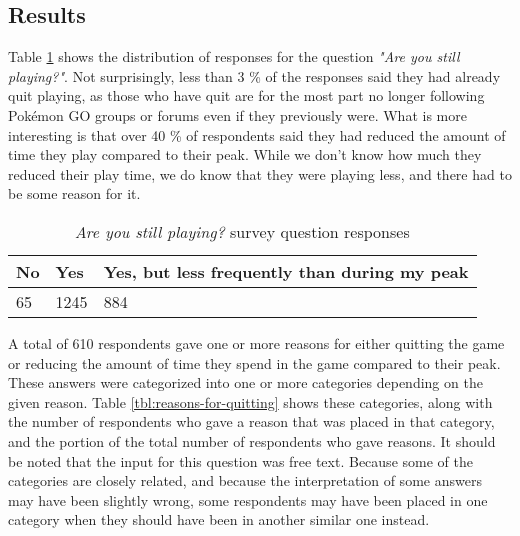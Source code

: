 

\subsection{Results}

Table \ref{tbl:still-playing} shows the distribution of responses for the question \emph{"Are you still playing?"}. Not surprisingly, less than 3 \% of the responses said they had already quit playing, as those who have quit are for the most part no longer following Pokémon GO groups or forums even if they previously were. What is more interesting is that over 40 \% of respondents said they had reduced the amount of time they play compared to their peak. While we don't know how much they reduced their play time, we do know that they were playing less, and there had to be some reason for it.

\begin{table}[h]
	\centering
	\begin{tabular}{|l|l|l|}
		\hline
		\textbf{No} & \textbf{Yes} & \textbf{Yes, but less frequently than during my peak}\\
		\hline\hline
		65 & 1245 & 884\\\hline
	\end{tabular}
	\caption{\emph{Are you still playing?} survey question responses}
	\label{tbl:still-playing}
\end{table}

A total of 610 respondents gave one or more reasons for either quitting the game or reducing the amount of time they spend in the game compared to their peak. These answers were categorized into one or more categories depending on the given reason. Table \ref{tbl:reasons-for-quitting} shows these categories, along with the number of respondents who gave a reason that was placed in that category, and the portion of the total number of respondents who gave reasons. It should be noted that the input for this question was free text. Because some of the categories are closely related, and because the interpretation of some answers may have been slightly wrong, some respondents may have been placed in one category when they should have been in another similar one instead.

